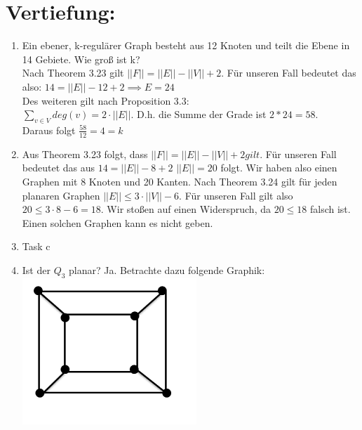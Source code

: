 



    \maketitle
    \section*{Vertiefung:}
    \begin{enumerate}[label=(\alph*)]
        \item  Ein ebener,
        k-regulärer Graph besteht aus
        12 Knoten und teilt die Ebene in
        14 Gebiete. Wie groß ist k? \\
        Nach Theorem 3.23 gilt $||F|| = ||E|| - ||V|| + 2$. Für unseren Fall bedeutet das also:
        $14 = ||E|| - 12 + 2 \implies E = 24$ \\
        Des weiteren gilt nach Proposition 3.3: \\
        $\sum_{v \in V} deg(v) = 2 \cdot ||E||$. D.h. die Summe der Grade ist $2 * 24 = 58$. \\
        Daraus folgt $\frac{58}{12} = 4 = k$
        
        \item Aus Theorem 3.23 folgt, dass $||F|| = ||E|| - ||V|| + 2 gilt $. Für unseren Fall bedeutet das aus $ 14 = ||E|| - 8 + 2 $ $ ||E|| = 20 $ folgt. Wir haben also einen Graphen mit 8 Knoten und 20 Kanten. Nach Theorem 3.24 gilt für jeden planaren Graphen $ ||E|| \leq 3 \cdot ||V|| - 6$. Für unseren Fall gilt also $20 \leq 3 \cdot 8 - 6  = 18$.
        Wir stoßen auf einen Widerspruch, da $20 \leq 18$ falsch ist. Einen solchen Graphen kann es nicht geben.
        
        
        \item Task c
        
        \item Ist der $Q_3$ planar? 
        Ja. Betrachte dazu folgende Graphik:\\
        \includegraphics{Q3}
        

\end{enumerate}
